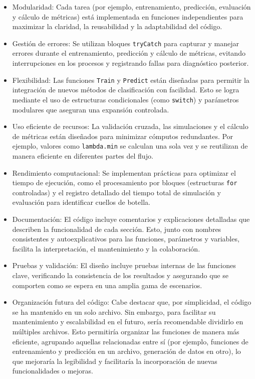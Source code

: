 \documentclass{report}
\begin{document}
\begin{itemize}
	\item Modularidad: Cada tarea (por ejemplo, entrenamiento, predicción, evaluación y cálculo de métricas) está implementada en funciones independientes para maximizar la claridad, la reusabilidad y la adaptabilidad del código.
	
	\item Gestión de errores: Se utilizan bloques \texttt{tryCatch} para capturar y manejar errores durante el entrenamiento, predicción y cálculo de métricas, evitando interrupciones en los procesos y registrando fallas para diagnóstico posterior.
	
	\item Flexibilidad: Las funciones \texttt{Train} y \texttt{Predict} están diseñadas para permitir la integración de nuevos métodos de clasificación con facilidad. Esto se logra mediante el uso de estructuras condicionales (como \texttt{switch}) y parámetros modulares que aseguran una expansión controlada.
	
	\item Uso eficiente de recursos: La validación cruzada, las simulaciones y el cálculo de métricas están diseñados para minimizar cómputos redundantes. Por ejemplo, valores como \texttt{lambda.min} se calculan una sola vez y se reutilizan de manera eficiente en diferentes partes del flujo.
	
	\item Rendimiento computacional: Se implementan prácticas para optimizar el tiempo de ejecución, como el procesamiento por bloques (estructuras \texttt{for} controladas) y el registro detallado del tiempo total de simulación y evaluación para identificar cuellos de botella.
	
	\item Documentación: El código incluye comentarios y explicaciones detalladas que describen la funcionalidad de cada sección. Esto, junto con nombres consistentes y autoexplicativos para las funciones, parámetros y variables, facilita la interpretación, el mantenimiento y la colaboración.

	\item Pruebas y validación: El diseño incluye pruebas internas de las funciones clave, verificando la consistencia de los resultados y asegurando que se comporten como se espera en una amplia gama de escenarios.

	\item Organización futura del código: Cabe destacar que, por simplicidad, el código se ha mantenido en un solo archivo. Sin embargo, para facilitar su mantenimiento y escalabilidad en el futuro, sería recomendable dividirlo en múltiples archivos. Esto permitiría organizar las funciones de manera más eficiente, agrupando aquellas relacionadas entre sí (por ejemplo, funciones de entrenamiento y predicción en un archivo, generación de datos en otro), lo que mejoraría la legibilidad y facilitaría la incorporación de nuevas funcionalidades o mejoras.
	

\end{itemize}
\end{document}
